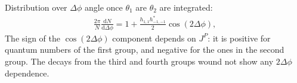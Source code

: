 \documentclass[prd,preprintnumbers,floatfix,
nofootinbib,superscriptaddress]{revtex4}
\newcommand{\diff}{\mathrm{d}}
\begin{document}
%
Distribution over $\Delta\phi$ angle once $\theta_1$ are $\theta_2$ are integrated:
\begin{align}
  \frac{2\pi}{N}\frac{\diff N}{\diff \Delta\phi} = 1
   + \frac{h_{1,1} h_{-1,-1}^*}{2} \cos(2 \Delta\phi),
\end{align}
The sign of the $\cos(2\Delta\phi)$ component depends on $J^P$: it is positive for quantum numbers of the first group, and negative for the ones in the second group.
The decays from the third and fourth groups wound not show any $2\Delta\phi$ dependence.
%

\end{document}
